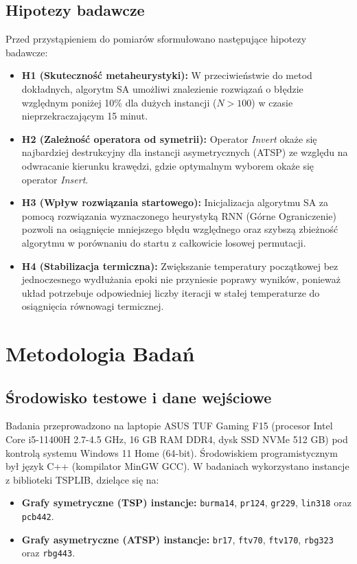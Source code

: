 \documentclass[conference]{IEEEtran}
\begin{document}
        \subsection{Hipotezy badawcze}
            Przed przystąpieniem do pomiarów sformułowano następujące hipotezy badawcze:
            \begin{itemize}
                \item \textbf{H1 (Skuteczność metaheurystyki):} W przeciwieństwie do metod dokładnych, algorytm SA umożliwi znalezienie rozwiązań o błędzie względnym poniżej 10\% dla dużych instancji ($N > 100$) w czasie nieprzekraczającym 15 minut.
                \item \textbf{H2 (Zależność operatora od symetrii):} Operator \textit{Invert} okaże się najbardziej destrukcyjny dla instancji asymetrycznych (ATSP) ze względu na odwracanie kierunku krawędzi, gdzie optymalnym wyborem okaże się operator \textit{Insert}.
                \item \textbf{H3 (Wpływ rozwiązania startowego):} Inicjalizacja algorytmu SA za pomocą rozwiązania wyznaczonego heurystyką RNN (Górne Ograniczenie) pozwoli na osiągnięcie mniejszego błędu względnego oraz szybszą zbieżność algorytmu w porównaniu do startu z całkowicie losowej permutacji.
                \item \textbf{H4 (Stabilizacja termiczna):} Zwiększanie temperatury początkowej bez jednoczesnego wydłużania epoki nie przyniesie poprawy wyników, ponieważ układ potrzebuje odpowiedniej liczby iteracji w stałej temperaturze do osiągnięcia równowagi termicznej.
            \end{itemize}


    \section{Metodologia Badań}
        \subsection{Środowisko testowe i dane wejściowe}
            Badania przeprowadzono na laptopie ASUS TUF Gaming F15 (procesor Intel Core i5-11400H 2.7-4.5 GHz, 16 GB RAM DDR4, dysk SSD NVMe 512 GB) pod kontrolą systemu Windows 11 Home (64-bit). Środowiskiem programistycznym był język C++ (kompilator MinGW GCC). 
            W badaniach wykorzystano instancje z biblioteki TSPLIB, dzielące się na:
            \begin{itemize}
                \item \textbf{Grafy symetryczne (TSP) instancje:} \texttt{burma14}, \texttt{pr124}, \texttt{gr229}, \texttt{lin318} oraz \texttt{pcb442}.
                \item \textbf{Grafy asymetryczne (ATSP) instancje:} \texttt{br17}, \texttt{ftv70}, \texttt{ftv170}, \texttt{rbg323} oraz \texttt{rbg443}.
            \end{itemize}
\end{document}
